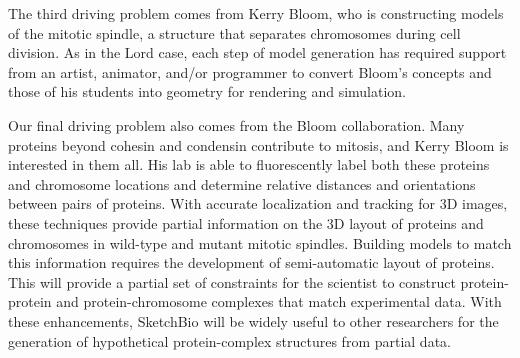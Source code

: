 \documentclass[twocolumn]{bmcart}%
\begin{document}
The third driving problem comes from Kerry Bloom, who is constructing models of the mitotic spindle, a structure that separates chromosomes during cell division.
As in the Lord case, each step of model generation has required support from an artist, animator, and/or programmer to convert Bloom's concepts and those of his students into geometry for rendering and simulation.

Our final driving problem also comes from the Bloom collaboration.
Many proteins beyond cohesin and condensin contribute to mitosis, and Kerry Bloom is interested in them all.  His lab is able to fluorescently label both these proteins and chromosome locations and determine relative distances and orientations between pairs of proteins.
With accurate localization and tracking for 3D images, these techniques provide partial information on the 3D layout of proteins and chromosomes in wild-type and mutant mitotic spindles.
Building models to match this information requires the development of semi-automatic layout of proteins.
This will provide a partial set of constraints for the scientist to construct protein-protein and protein-chromosome complexes that match experimental data.
With these enhancements, SketchBio will be widely useful to other researchers for the generation of hypothetical protein-complex structures from partial data.
\end{document}
